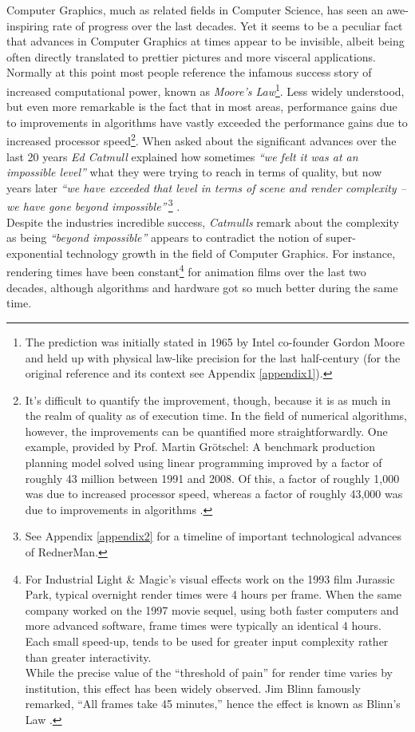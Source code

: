 Computer Graphics, much as related fields in Computer Science, has seen an awe-inspiring rate of progress over the last decades.
Yet it seems to be a peculiar fact that advances in Computer Graphics at times appear to be invisible, albeit being often directly translated to prettier pictures and more visceral applications.\\
Normally at this point most people reference the infamous success story of increased computational power, known as \textit{Moore’s Law}\footnote{ The prediction was initially stated in 1965 by Intel co-founder Gordon Moore and held up with physical law-like precision for the last half-century (for the original reference and its context see Appendix \ref{appendix1}).}.
Less widely understood, but even more remarkable is the fact that in most areas, performance gains due to improvements in algorithms have vastly exceeded the performance gains due to increased processor speed\footnote{ It’s difficult to quantify the improvement, though, because it is as much in the realm of quality as of execution time.
In the field of numerical algorithms, however, the improvements can be quantified more straightforwardly.
One example, provided by Prof. Martin Grötschel: A benchmark production planning model solved using linear programming improved by a factor of roughly 43 million between 1991 and 2008.
Of this, a factor of roughly 1,000 was due to increased processor speed, whereas a factor of roughly 43,000 was due to improvements in algorithms \citep[][cf. p.71]{Holdren2010}.}.
When asked about the significant advances over the last 20 years \textit{Ed Catmull} explained how sometimes \textit{``we felt it was at an impossible level''} what they were trying to reach in terms of quality, but now years later \textit{``we have exceeded that level in terms of scene and render complexity -- we have gone beyond impossible''}\,\footnote{ See Appendix \ref{appendix2} for a timeline of important technological advances of RednerMan.} \citep[Edwin „Ed“ Catmull, president of Walt Disney \& Pixar Animation Studios, citet in:][]{Seymour2008}.\\
Despite the industries incredible success, \textit{Catmulls} remark about the complexity as being \textit{“beyond impossible”} appears to contradict the notion of super-exponential technology growth in the field of Computer Graphics.
For instance, rendering times have been constant\footnote{ For Industrial Light \& Magic’s visual effects work on the 1993 film Jurassic Park, typical overnight render times were 4 hours per frame. When the same company worked on the 1997 movie sequel, using both faster computers and more advanced software, frame times were typically an identical 4 hours. Each small speed-up, tends to be used for greater input complexity rather than greater interactivity.\\ While the precise value of the “threshold of pain” for render time varies by institution, this effect has been widely observed. Jim Blinn famously remarked, “All frames take 45 minutes,” hence the effect is known as Blinn’s Law \citep[][cf. Chapter 3]{Enderton2011}.}  for animation films over the last two decades, although algorithms and hardware got so much better during the same time.
